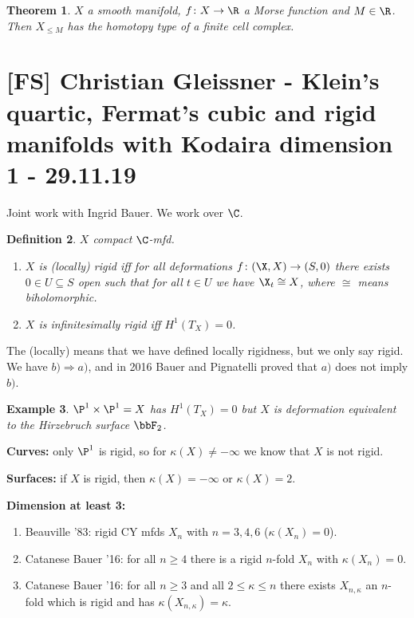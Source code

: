 \documentclass[A4paper, british]{amsart}
\theoremstyle{darkgreentheorem}
\newtheorem{thm}{Theorem}[section]
\theoremstyle{darkbluedefinition}
\newtheorem{defn}[thm]{Definition}
\theoremstyle{darkredexample}
\newtheorem{exa}[thm]{Example}
\theoremstyle{remark}
\newcommand{\1}{\mathbbm{1}}
\newcommand{\tms}{\times}
\newcommand{\sub}{\subseteq}
\begin{document}
\begin{thm}
    $X$ a smooth manifold, $f\colon X\to \R$ a Morse function and $M\in \R$.
    Then $X_{\leqslant M}$ has the homotopy type of a finite cell complex.
\end{thm}

\section{[FS] Christian Gleissner - Klein's quartic, Fermat's cubic and rigid manifolds with Kodaira dimension 1 - 29.11.19}

Joint work with Ingrid Bauer.
We work over $\C$.

\begin{defn}
    $X$ compact $\C$-mfd.
    \begin{enumerate}[label=\alph*)]
	\item $X$ is (locally) rigid iff for all deformations $f\colon (\X,X)\to (S,0)$ there exists $0\in U\sub S$ open such that for all $t\in U$ we have $\X_{t}\cong X$, where $\cong$ means biholomorphic.
	\item $X$ is infinitesimally rigid iff $H^{1}(T_{X})=0$.
    \end{enumerate}
\end{defn}

The (locally) means that we have defined locally rigidness, but we only say rigid.
We have $b)\Rightarrow a)$, and in 2016 Bauer and Pignatelli proved that $a)$ does not imply $b)$.

\begin{exa}
    $\P^{1}\tms\P^{1}=X$ has $H^{1}(T_{X})=0$ but $X$ is deformation equivalent to the Hirzebruch surface $\bbF_{2}$.
\end{exa}

\textbf{Curves:} only $\P^{1}$ is rigid, so for $\kappa(X)\neq -\infty$ we know that $X$ is not rigid.

\textbf{Surfaces:} if $X$ is rigid, then $\kappa(X)=-\infty$ or $\kappa(X)=2$.

\textbf{Dimension at least 3:}
\begin{enumerate}[label=\alph*)]
    \item Beauville '83: rigid CY mfds $X_{n}$ with $n=3,4,6$ ($\kappa(X_{n})=0$).
    \item Catanese Bauer '16: for all $n\geqslant 4$ there is a rigid $n$-fold $X_{n}$ with $\kappa(X_{n})=0$.
    \item Catanese Bauer '16: for all $n\geqslant 3$ and all $2\leqslant \kappa\leqslant n$ there exists $X_{n,\kappa}$ an $n$-fold which is rigid and has $\kappa(X_{n,\kappa})=\kappa$.
\end{enumerate}
\end{document}
